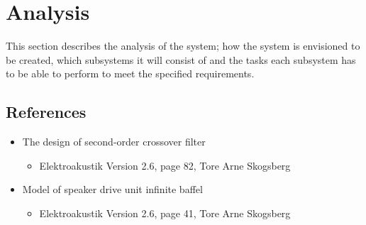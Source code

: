 
\chapter{Analysis}

This section describes the analysis of the system; how the system is envisioned to be created, which subsystems it will consist of and the tasks each subsystem has to be able to perform to meet the specified requirements.


\section{References}
\begin{itemize}
	\item The design of second-order crossover filter
	\begin{itemize}
		\item Elektroakustik Version 2.6, page 82, Tore Arne Skogsberg
	\end{itemize}
	\item Model of speaker drive unit infinite baffel
	\begin{itemize}
		\item Elektroakustik Version 2.6, page 41, Tore Arne Skogsberg
	\end{itemize}
\end{itemize}



\FloatBarrier

